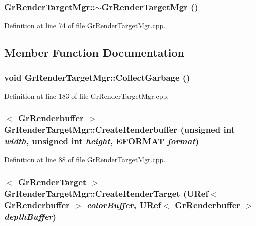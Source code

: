 \begin{CompactItemize}
{\subsubsection[{$\sim$GrRenderTargetMgr}]{\setlength{\rightskip}{0pt plus 5cm}GrRenderTargetMgr::$\sim$GrRenderTargetMgr ()}}
\label{class_gr_render_target_mgr_850e21f4c7588233f838e1132cbff3cc}




Definition at line 74 of file GrRenderTargetMgr.cpp.

\subsection{Member Function Documentation}
\hypertarget{class_gr_render_target_mgr_a5f0a084c32ef56fc09838283c637cb7}{
\subsubsection[{CollectGarbage}]{\setlength{\rightskip}{0pt plus 5cm}void GrRenderTargetMgr::CollectGarbage ()}}
\label{class_gr_render_target_mgr_a5f0a084c32ef56fc09838283c637cb7}




Definition at line 183 of file GrRenderTargetMgr.cpp.\hypertarget{class_gr_render_target_mgr_fabad7a065e67c6bd8f04e98e1501061}{
\subsubsection[{CreateRenderbuffer}]{$<$ {\bf GrRenderbuffer} $>$ GrRenderTargetMgr::CreateRenderbuffer (unsigned int {\em width}, \/  unsigned int {\em height}, \/  {\bf EFORMAT} {\em format})}}
\label{class_gr_render_target_mgr_fabad7a065e67c6bd8f04e98e1501061}




Definition at line 88 of file GrRenderTargetMgr.cpp.\hypertarget{class_gr_render_target_mgr_b46557c99e5ac73863beeb5d3d671302}{
\subsubsection[{CreateRenderTarget}]{$<$ {\bf GrRenderTarget} $>$ GrRenderTargetMgr::CreateRenderTarget ({\bf URef}$<$ {\bf GrRenderbuffer} $>$ {\em colorBuffer}, \/  {\bf URef}$<$ {\bf GrRenderbuffer} $>$ {\em depthBuffer})}}
\label{class_gr_render_target_mgr_b46557c99e5ac73863beeb5d3d671302}





\end{CompactItemize}
